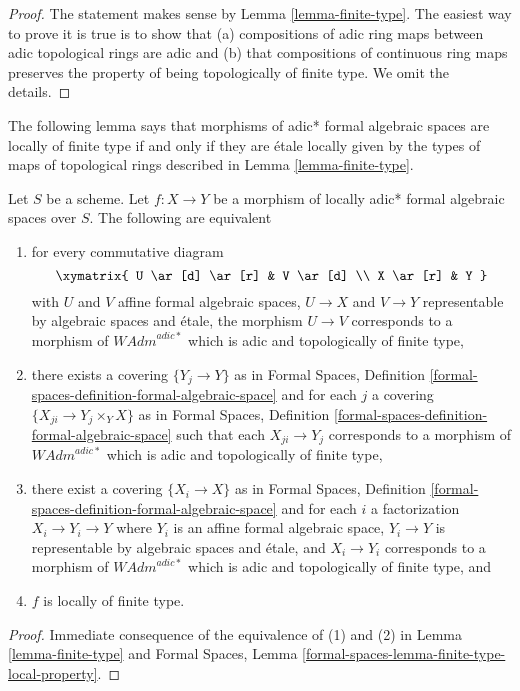\begin{proof}
The statement makes sense by Lemma \ref{lemma-finite-type}.
The easiest way to prove it is true is to show that
(a) compositions of adic ring maps between adic topological rings
are adic and (b) that compositions of continuous ring maps
preserves the property of being topologically of finite type.
We omit the details.
\end{proof}

\noindent
The following lemma says that morphisms of adic* formal algebraic spaces
are locally of finite type if and only if they are \'etale locally given
by the types of maps of topological rings described in
Lemma \ref{lemma-finite-type}.

\begin{lemma}
\label{lemma-finite-type-morphisms}
Let $S$ be a scheme. Let $f : X \to Y$ be a morphism of
locally adic* formal algebraic spaces over $S$.
The following are equivalent
\begin{enumerate}
\item for every commutative diagram
$$
\xymatrix{
U \ar[d] \ar[r] & V \ar[d] \\
X \ar[r] & Y
}
$$
with $U$ and $V$ affine formal algebraic spaces, $U \to X$ and $V \to Y$
representable by algebraic spaces and \'etale, the morphism $U \to V$
corresponds to a morphism of $\textit{WAdm}^{adic*}$ which is
adic and topologically of finite type,
\item there exists a covering $\{Y_j \to Y\}$ as in
Formal Spaces,
Definition \ref{formal-spaces-definition-formal-algebraic-space}
and for each $j$
a covering $\{X_{ji} \to Y_j \times_Y X\}$ as in
Formal Spaces,
Definition \ref{formal-spaces-definition-formal-algebraic-space}
such that each $X_{ji} \to Y_j$  corresponds
to a morphism of $\textit{WAdm}^{adic*}$ which is adic and
topologically of finite type,
\item there exist a covering $\{X_i \to X\}$ as in
Formal Spaces,
Definition \ref{formal-spaces-definition-formal-algebraic-space}
and for each $i$ a factorization $X_i \to Y_i \to Y$ where $Y_i$
is an affine formal algebraic space, $Y_i \to Y$ is representable
by algebraic spaces and \'etale, and $X_i \to Y_i$ corresponds
to a morphism of $\textit{WAdm}^{adic*}$ which is adic and topologically
of finite type, and
\item $f$ is locally of finite type.
\end{enumerate}
\end{lemma}

\begin{proof}
Immediate consequence of the equivalence of (1) and (2) in
Lemma \ref{lemma-finite-type} and
Formal Spaces, Lemma
\ref{formal-spaces-lemma-finite-type-local-property}.
\end{proof}










